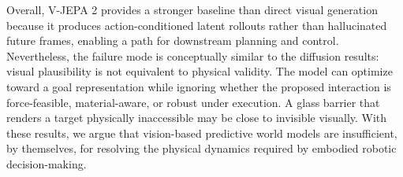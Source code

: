\documentclass{article}
\begin{document}
Overall, V-JEPA 2 provides a stronger baseline than direct visual generation because it produces action-conditioned latent rollouts rather than hallucinated future frames, enabling a path for downstream planning and control. 
Nevertheless, the failure mode is conceptually similar to the diffusion results: visual plausibility is not equivalent to physical validity. 
The model can optimize toward a goal representation while ignoring whether the proposed interaction is force-feasible, material-aware, or robust under execution. A glass barrier that renders a target physically inaccessible may be close to invisible visually.
With these results, we argue that vision-based predictive world models are insufficient, by themselves, for resolving the physical dynamics required by embodied robotic decision-making.
\end{document}
